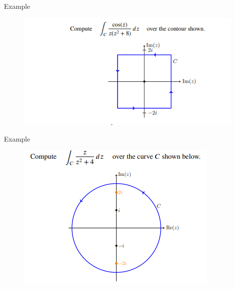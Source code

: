 \documentclass[11pt]{beamer}
\theoremstyle{plain}
\begin{document}


\begin{frame}{Example}
    \begin{figure}
        \centering
        \includegraphics[width=1\linewidth]{Screenshot 2025-09-04 104207.png}
    \end{figure}
\end{frame}

\begin{frame}{Example}
    \begin{figure}
        \centering
        \includegraphics[width=1\linewidth]{Screenshot 2025-09-04 104827.png}
    \end{figure}
\end{frame}
\end{document}
